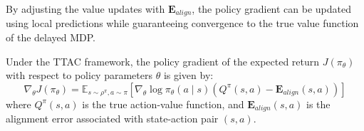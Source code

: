 \documentclass[manuscript, screen, review]{jair}
\begin{document}
By adjusting the value updates with $\mathbf{E}_{align}$, the policy gradient can be updated using local predictions while guaranteeing convergence to the true value function of the delayed MDP.

\begin{theorem}
Under the TTAC framework, the policy gradient of the expected return $J(\pi_\theta)$ with respect to policy parameters $\theta$ is given by:
\begin{equation}
    \nabla_\theta J(\pi_\theta) = \mathbb{E}_{s \sim \rho^\pi, a \sim \pi} \left[ \nabla_\theta \log \pi_\theta(a \mid s) \left( Q^{\pi}(s, a) - \mathbf{E}_{align}(s, a) \right) \right]
\end{equation}
where $Q^{\pi}(s, a)$ is the true action-value function, and $\mathbf{E}_{align}(s, a)$ is the alignment error associated with state-action pair $(s, a)$.
\end{theorem}
\end{document}
